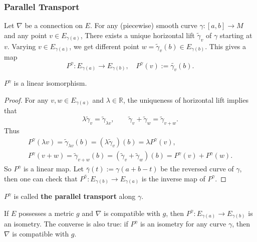 
\subsubsection{Parallel Transport}
Let $\nabla$ be a connection on $E$. For any (piecewise) smooth curve $\gamma: [a,b] \to M$ and any point $v\in E_{\gamma(a)}$, 
There exists a unique horizontal lift $\tilde{\gamma}_{v}$ of $\gamma$ starting at $v$. 
Varying $v\in E_{\gamma(a)}$, we get different point $w=\tilde{\gamma}_{v}(b)\in E_{\gamma(b)}$. 
This gives a map
\begin{equation*}
    P^\gamma: E_{\gamma(a)} \to E_{\gamma(b)}, \quad P^\gamma(v) := \tilde{\gamma_{v}}(b).
\end{equation*}
\begin{proposition}
    $P^\gamma$ is a linear isomorphism.
\end{proposition}
\begin{proof}
    For any $v,w\in E_{\gamma(a)}$ and $\lambda\in \mathbb{R}$, 
    the uniqueness of horizontal lift implies that 
    \begin{equation*}
        \lambda \tilde{\gamma}_v = \tilde{\gamma}_{\lambda v}, \qquad 
        \tilde{\gamma}_v + \tilde{\gamma}_w = \tilde{\gamma}_{v+w}.
    \end{equation*}
    Thus 
    \begin{gather*}
        P^\gamma(\lambda v) = \tilde{\gamma}_{\lambda v}(b) = (\lambda \tilde{\gamma}_v)(b) = \lambda P^\gamma(v), \\
        P^\gamma(v+w) = \tilde{\gamma}_{v+w}(b) = (\tilde{\gamma}_v + \tilde{\gamma}_w)(b) = P^\gamma(v) + P^\gamma(w).
    \end{gather*}
    So $P^\gamma$ is a linear map. 
    Let $\bar{\gamma}(t) := \gamma(a+b-t)$ be the reversed curve of $\gamma$, 
    then one can check that $P^{\bar{\gamma}}: E_{\gamma(b)} \to E_{\gamma(a)}$ is the inverse map of $P^\gamma$. 
\end{proof}
\begin{definition}
    $P^\gamma$ is called \textbf{the parallel transport} along $\gamma$.
\end{definition}
\begin{remark}
    If $E$ possesses a metric $g$ and $\nabla$ is compatible with $g$, 
    then $P^\gamma: E_{\gamma(a)} \to E_{\gamma(b)}$ is an isometry. 
    The converse is also true: 
    if $P^\gamma$ is an isometry for any curve $\gamma$, 
    then $\nabla$ is compatible with $g$.
\end{remark}
